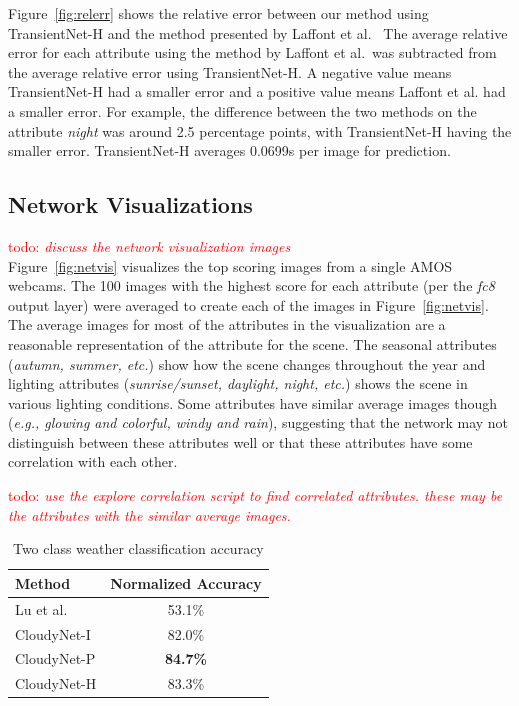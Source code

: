 \documentclass[10pt,twocolumn,letterpaper]{article}
\newcommand{\todo}[1]{\textcolor{red}{todo: {\em #1}}}
\newcommand{\figref}[1]{Figure~\ref{fig:#1}}
\begin{document}
\figref{relerr} shows the relative error between our method using
TransientNet-H and the method presented by Laffont et al.~\cite{Laffont14}  The
average relative error for each attribute using the method by Laffont et al.\
was subtracted from the average relative error using TransientNet-H.  A
negative value means TransientNet-H had a smaller error and a positive value
means Laffont et al. had a smaller error.  For example, the difference between
the two methods on the attribute \emph{night} was around 2.5 percentage points,
with TransientNet-H having the smaller error.  TransientNet-H averages 0.0699s
per image for prediction. 

\subsection{Network Visualizations}
\todo{discuss the network visualization images} \\
\indent
\figref{netvis} visualizes the top scoring images from a single
AMOS~\cite{jacobs07amos} webcams.  The 100 images with the highest score for
each attribute (per the \textit{fc8} output layer) were averaged to create each
of the images in \figref{netvis}. The average images for most of the attributes
in the visualization are a reasonable representation of the attribute for the
scene.  The seasonal attributes (\textit{autumn, summer, etc.}) show how the
scene changes throughout the year and lighting attributes
(\textit{sunrise/sunset, daylight, night, etc.}) shows the scene in various
lighting conditions.  Some attributes have similar average images though
(\textit{e.g., glowing and colorful, windy and rain}), suggesting that the
network may not distinguish between these attributes well or that these
attributes have some correlation with each other.

\todo{use the explore correlation script to find correlated attributes. these
      may be the attributes with the similar average images.} 

\begin{table}[t]
	\centering
	\begin{tabular}{ | l | c | }
		\hline
			Method & Normalized Accuracy \\ \hline \hline
			Lu et al.~\cite{lutwoclass}& 53.1\% \\ \hline
			CloudyNet-I & 82.0\% \\ \hline
			CloudyNet-P & \textbf{84.7\%} \\ \hline
			CloudyNet-H & 83.3\% \\ 
		\hline
	\end{tabular}
	\caption{Two class weather classification accuracy}
	\label{tbl:twoclass}
\end{table}
\end{document}
